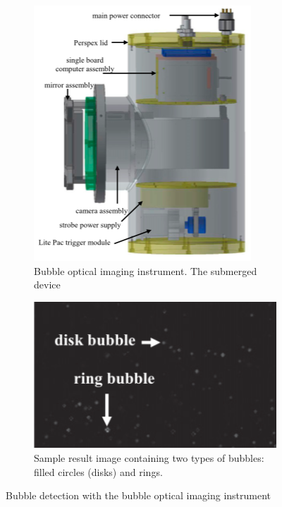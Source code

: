 		\begin{figure}
			\centering
			\begin{subfigure}[b]{0.55\textwidth}
				\includegraphics[scale=.4]{images/bubble_optical_imaging_instrument.png}
				\caption{Bubble optical imaging instrument. The submerged device }
				\label{subfig:optical_imaging}
			\end{subfigure}
			
			\begin{subfigure}[b]{0.55\textwidth}
				\includegraphics[scale=.7]{images/sample_result_optical_imaging_instrument.png}
				\caption{Sample result image containing two types of bubbles: filled circles (disks) and rings. }
				\label{subfig:result_optical_imaging}
			\end{subfigure}
			\label{fig:optical_imaging}
			\caption{Bubble detection with the bubble optical imaging instrument}
		\end{figure}		























